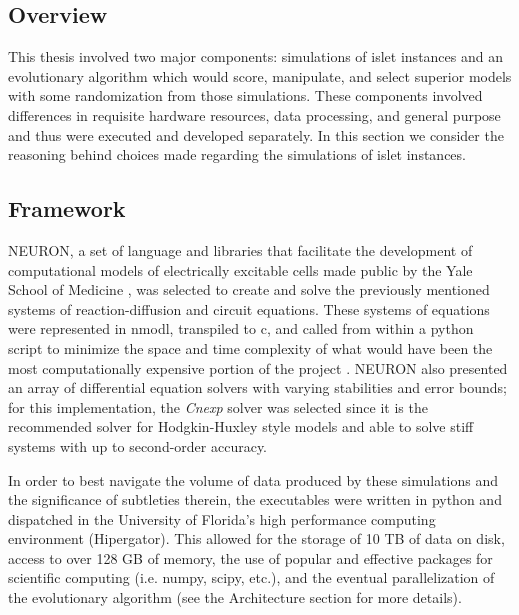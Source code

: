 \subsection{Overview}
This thesis involved two major components: simulations of islet instances and an evolutionary algorithm which would score, manipulate, and select superior models with some randomization from those simulations. These components involved differences in requisite hardware resources, data processing, and general purpose and thus were executed and developed separately. In this section we consider the reasoning behind choices made regarding the simulations of islet instances.
\subsection{Framework}
NEURON, a set of language and libraries that facilitate the development of computational models of electrically excitable cells made public by the Yale School of Medicine \cite{hines_neuron_1997}, was selected to create and solve the previously mentioned systems of reaction-diffusion and circuit equations. These systems of equations were represented in nmodl, transpiled to c, and called from within a python script to minimize the space and time complexity of what would have been the most computationally expensive portion of the project  \cite{hines_expanding_2000}. NEURON also presented an array of differential equation solvers with varying stabilities and error bounds; for this implementation, the \emph{Cnexp} solver was selected since it is the recommended solver for Hodgkin-Huxley style models and able to solve stiff systems with up to second-order accuracy.
\par In order to best navigate the volume of data produced by these simulations and the significance of subtleties therein, the executables were written in python and dispatched in the University of Florida's high performance computing environment (Hipergator). This allowed for the storage of 10 TB of data on disk, access to over 128 GB of memory, the use of popular and effective packages for scientific computing (i.e. numpy, scipy, etc.), and the eventual parallelization of the evolutionary algorithm (see the Architecture section for more details).
